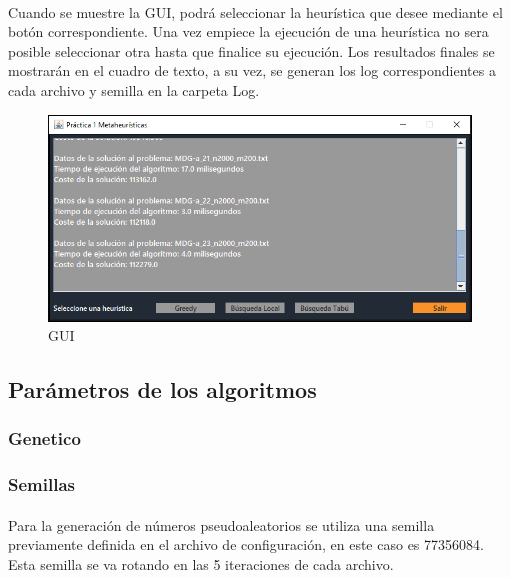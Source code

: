 		\paragraph{}Cuando se muestre la GUI, podrá seleccionar la heurística que desee mediante el botón correspondiente. Una vez empiece la ejecución de una heurística no sera posible seleccionar otra hasta que finalice su ejecución. Los resultados finales se mostrarán en el cuadro de texto, a su vez, se generan los log correspondientes a cada archivo y semilla en la carpeta Log.
	
		\begin{figure}[H]
		
			\centering
			\includegraphics[scale=0.4]{img/GUI}
			\caption{GUI}
		
		\end{figure}
	
	\subsection{Parámetros de los algoritmos}
	
		\subsubsection{Genetico}


	
	\subsubsection{Semillas}
	
	\paragraph{}Para la generación de números pseudoaleatorios se utiliza una semilla previamente definida en el archivo de configuración, en este caso es 77356084. Esta semilla se va rotando en las 5 iteraciones de cada archivo.
	
